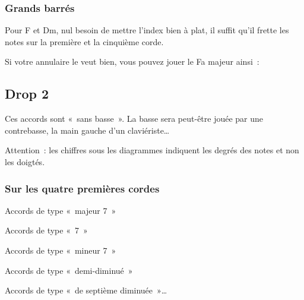 \documentclass[11pt]{article}
\begin{document}

\subsubsection{Grands barrés}



Pour F et Dm, nul besoin de mettre l’index bien à plat, il suffit qu’il
frette les notes sur la première et la cinquième corde.

Si votre annulaire le veut bien, vous pouvez jouer le Fa majeur ainsi~:


\subsection{Drop 2}

Ces accords sont «~sans basse~». La basse sera peut-être jouée par une
contrebasse, la main gauche d’un claviériste…

Attention~: les chiffres sous les diagrammes indiquent les degrés des notes et
non les doigtés.

\subsubsection{Sur les quatre premières cordes}

Accords de type «~majeur 7~»


Accords de type «~7~»


Accords de type «~mineur 7~»


Accords de type «~demi-diminué~»


Accords de type «~de septième diminuée~»…
\end{document}
